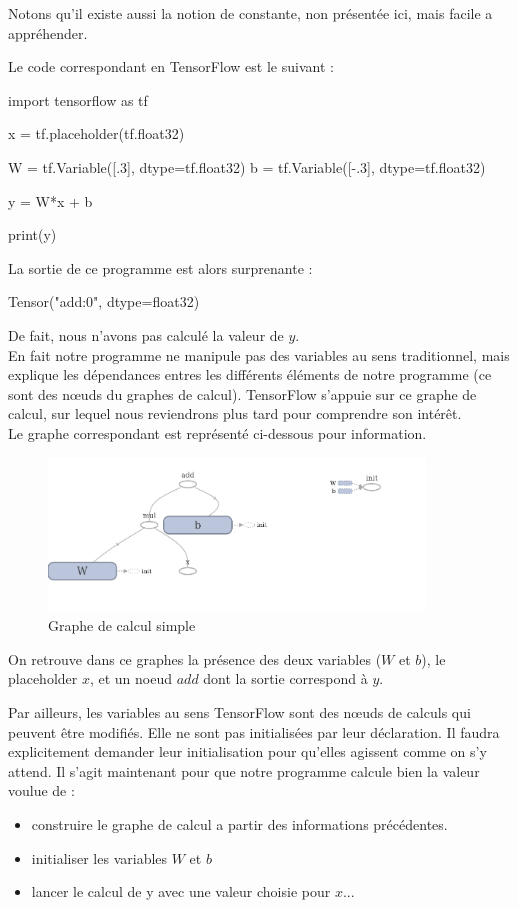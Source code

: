 \documentclass[a4paper,11pt]{book}
\begin{document}
Notons qu'il existe aussi la notion de constante, non présentée ici, mais facile a appréhender.

Le code correspondant en TensorFlow est le suivant :
\begin{mypython}
import tensorflow as tf

x = tf.placeholder(tf.float32)

W = tf.Variable([.3], dtype=tf.float32)
b = tf.Variable([-.3], dtype=tf.float32)

y = W*x + b

print(y)
\end{mypython}

La sortie de ce programme est alors surprenante :
\begin{myoutput}
Tensor("add:0", dtype=float32)
\end{myoutput}

De fait, nous n'avons pas calculé la valeur de $y$.\\
En fait notre programme ne manipule pas des variables au sens traditionnel, mais explique les dépendances entres les différents éléments de notre programme (ce sont des nœuds du graphes de calcul). TensorFlow s'appuie sur ce graphe de calcul, sur lequel nous reviendrons plus tard pour comprendre son intérêt.\\

Le graphe correspondant est représenté ci-dessous pour information.
\begin{figure}[H]

\begin{center}
\includegraphics[width=10cm]{./figures/graphAddition.png} 
\end{center}
\caption{Graphe de calcul simple}
\end{figure}

On retrouve dans ce graphes la présence des deux variables ($W$ et $b$), le placeholder $x$, et un noeud $add$ dont la sortie correspond à $y$.


Par ailleurs, les variables au sens TensorFlow sont des nœuds de calculs qui peuvent être modifiés. Elle ne sont pas initialisées par leur déclaration. Il faudra explicitement demander leur initialisation pour qu'elles agissent comme on s'y attend.
Il s'agit maintenant pour que notre programme calcule bien la valeur voulue de :
\begin{itemize}
\item construire le graphe de calcul a partir des informations précédentes.
\item initialiser les variables $W$ et $b$
\item lancer le calcul de y avec une valeur choisie pour $x$...
\end{itemize}
\end{document}
